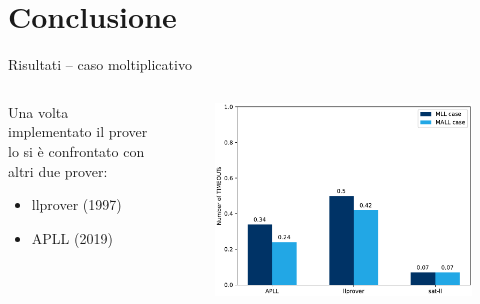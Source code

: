 \documentclass{beamer}
\begin{document}
\section{Conclusione}
\begin{frame}{Risultati -- caso moltiplicativo}
	\begin{columns}
		\begin{column}{.5\textwidth}
			Una volta implementato il prover lo si è confrontato con altri due prover:
			\begin{itemize}
				\item llprover (1997)
				\item APLL (2019)
			\end{itemize}
		\end{column}
		\begin{column}{.5\textwidth}
			\begin{figure}[H]
				\centering
				\includegraphics[scale=.4]{images/graph}
			\end{figure}
		\end{column}
	\end{columns}
\end{frame}
\end{document}

